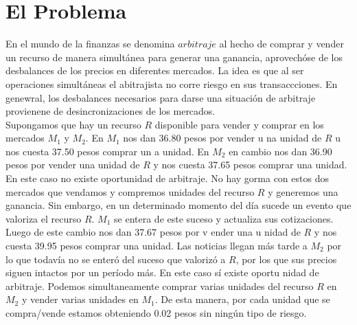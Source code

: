\documentclass[11pt,a4paper]{article}
\begin{document}

\fecha{\today}



\maketitle

\pagebreak

\section{\huge El Problema}

En el mundo de la finanzas se denomina $arbitraje$ al hecho de comprar y vender un recurso de manera simult\'anea para generar una ganancia, aprovech\'ose de los desbalances de los precios en diferentes mercados. La idea es que al ser operaciones simult\'aneas el abitrajista no corre riesgo en sus transaccciones. En genewral, los desbalances necesarios para darse una situaci\'on de arbitraje provienene de desincronizaciones de los mercados.
\\

Supongamos que hay un recurso $R$ disponible para vender y comprar en los mercados $M_{1}$ y $M_{2}$. En $M_{1}$ nos dan 36.80 pesos por vender u na unidad de $R$ u nos cuesta 37.50 pesos comprar un a unidad. En $M_{2}$ en cambio nos dan 36.90 pesos por vender una unidad  de $R$ y nos cuesta 37.65 pesos comprar una unidad. En este caso no existe oportunidad de arbitraje. No hay gorma con estos dos mercados que vendamos y compremos unidades del recurso $R$ y generemos una ganancia. Sin embargo, en un determinado momento del d\'ia sucede un evento que valoriza el recurso $R$. $M_{1}$ se entera de este suceso y actualiza sus cotizaciones. Luego de este cambio nos dan 37.67 pesos por v ender una u nidad de $R$ y nos cuesta 39.95 pesos comprar una unidad. Las noticias llegan m\'as tarde a $M_{2}$ por lo que todav\'ia no se enter\'o del suceso que valoriz\'o a $R$, por los que sus precios siguen intactos por un per\'iodo m\'as. En este caso s\'i existe oportu nidad de arbitraje.  Podemos simultaneamente comprar varias unidades del recurso $R$ en $M_{2}$ y vender varias unidades en $M_{1}$. De esta manera, por cada unidad que se compra/vende estamos obteniendo 0.02 pesos sin ning\'un tipo de riesgo.
\\
\end{document}
